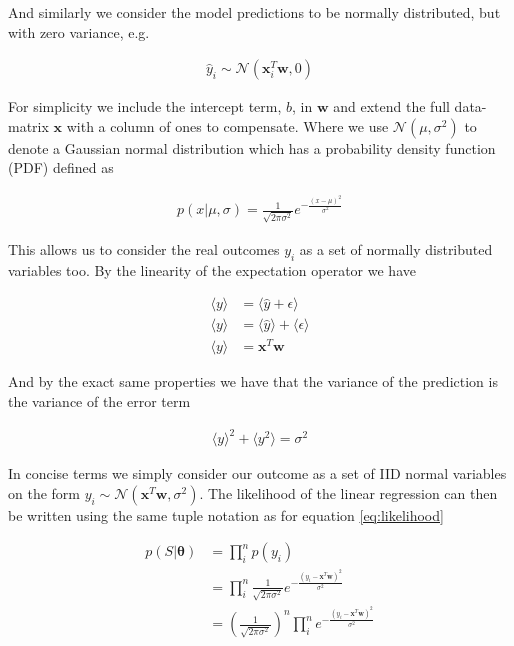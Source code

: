 \noindent And similarly we consider the model predictions to be normally distributed, but with zero variance, e.g.

\begin{align}
\hat{y}_i \sim \mathcal{N}(\mathbf{x}_i^T\mathbf{w}, 0)
\end{align}

\noindent For simplicity we include the intercept term, $b$,  in $\mathbf{w}$ and extend the full data-matrix $\mathbf{x}$ with a column of ones to compensate. Where we use $\mathcal{N}(\mu, \sigma^2)$ to denote a Gaussian normal distribution which has a probability density function (PDF) defined as 

\begin{align}
p(x | \mu, \sigma) = \frac{1}{\sqrt{2\pi \sigma^2}}e^{-\frac{(x - \mu)^2}{\sigma^2}}
\end{align}

\noindent This allows us to consider the real outcomes $y_i$ as a set of normally distributed variables too. By the linearity of the expectation operator we have 

\begin{align}
\langle y \rangle &= \langle \hat{y} + \epsilon \rangle  \\
\langle y \rangle &= \langle \hat{y} \rangle + \langle \epsilon \rangle \\
\langle y \rangle &= \mathbf{x}^T\mathbf{w}
\end{align}

\noindent And by the exact same properties we have that the variance of the prediction is the variance of the error term 

\begin{align}
\langle y\rangle^2 + \langle y^2\rangle = \sigma^2
\end{align}

\noindent In concise terms we simply consider our outcome as a set of IID normal variables on the form $y_i \sim \mathcal{N}(\mathbf{x}^T\mathbf{w}, \sigma^2)$. The likelihood of the linear regression can then be written using the same tuple notation as for equation \ref{eq:likelihood}

\begin{align}
p(S|\mathbf{\theta}) &= \prod_i^n p(y_i) \\
&= \prod_i^n \frac{1}{\sqrt{2\pi \sigma^2}}e^{-\frac{(y_i - \mathbf{x}^T\mathbf{w})^2}{\sigma^2}} \\
&= \left(\frac{1}{\sqrt{2\pi \sigma^2}} \right)^n \prod_i^n e^{-\frac{(y_i - \mathbf{x}^T\mathbf{w})^2}{\sigma^2}}
\end{align}

